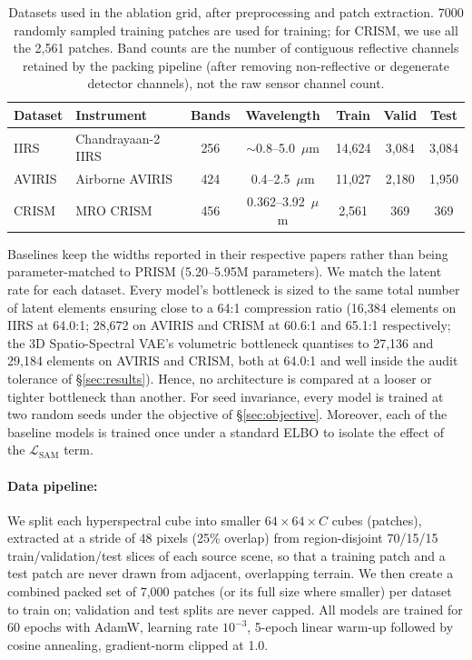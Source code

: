 \documentclass[twoside,11pt]{article}
\newcommand{\LSAM}{\mathcal{L}_{\mathrm{SAM}}}
\begin{document}
\begin{table}[t]
  \centering
  \begin{tabular}{llccccc}
    \toprule
    Dataset & Instrument & Bands & Wavelength & Train & Valid & Test \\
    \midrule
    IIRS   & Chandrayaan-2 IIRS & 256 & $\sim$0.8--5.0~$\mu$m & 14,624 & 3,084 & 3,084 \\
    AVIRIS & Airborne AVIRIS    & 424 & 0.4--2.5~$\mu$m       & 11,027 & 2,180 & 1,950 \\
    CRISM  & MRO CRISM          & 456 & 0.362--3.92~$\mu$m    & 2,561  & 369   & 369   \\
    \bottomrule
  \end{tabular}
  \caption{Datasets used in the ablation grid, after preprocessing and patch extraction. 7000 randomly sampled training patches are used for training; for CRISM, we use all the 2,561 patches. Band counts are the number of contiguous reflective channels retained by the packing pipeline (after removing non-reflective or degenerate detector channels), not the raw sensor channel count.}
  \label{tab:datasets}
\end{table}

Baselines keep the widths reported in their respective papers rather than being parameter-matched to PRISM (5.20--5.95M parameters). We match the latent rate for each dataset. Every model's bottleneck is sized to the same total number of latent elements ensuring close to a 64:1 compression ratio (16,384 elements on IIRS at 64.0:1; 28,672 on AVIRIS and CRISM at 60.6:1 and 65.1:1 respectively; the 3D Spatio-Spectral VAE's volumetric bottleneck quantises to 27,136 and 29,184 elements on AVIRIS and CRISM, both at 64.0:1 and well inside the audit tolerance of \S\ref{sec:results}). Hence, no architecture is compared at a looser or tighter bottleneck than another. For seed invariance, every model is trained at two random seeds under the objective of \S\ref{sec:objective}. Moreover, each of the baseline models is trained once under a standard ELBO to isolate the effect of the $\LSAM$ term.

\paragraph{Data pipeline:}
We split each hyperspectral cube into smaller $64{\times}64{\times}C$ cubes (patches), extracted at a stride of 48 pixels (25\% overlap) from region-disjoint 70/15/15 train\slash validation\slash test slices of each source scene, so that a training patch and a test patch are never drawn from adjacent, overlapping terrain. We then create a combined packed set of 7,000 patches (or its full size where smaller) per dataset to train on; validation and test splits are never capped. All models are trained for 60 epochs with AdamW, learning rate $10^{-3}$, 5-epoch linear warm-up followed by cosine annealing, gradient-norm clipped at 1.0.
\end{document}
